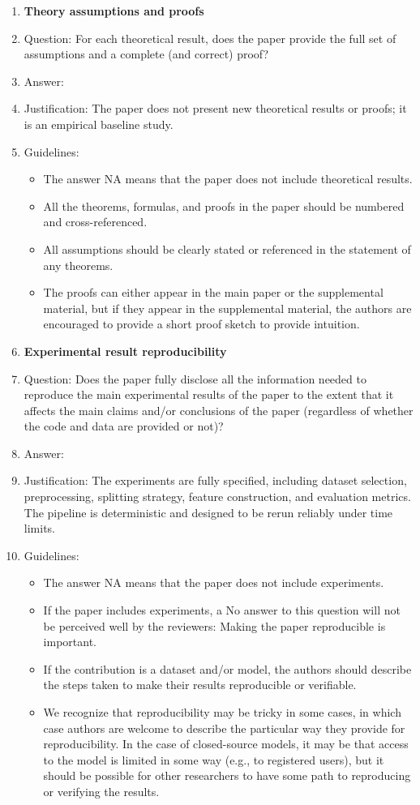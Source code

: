 \documentclass{article}
\theoremstyle{plain}
\theoremstyle{definition}
\theoremstyle{remark}
\begin{document}
\begin{enumerate}
		\item {\bf Theory assumptions and proofs}
		\item[] Question: For each theoretical result, does the paper provide the full set of assumptions and a complete (and correct) proof?
		\item[] Answer: \answerNA{}
		\item[] Justification: The paper does not present new theoretical results or proofs; it is an empirical baseline study.
		\item[] Guidelines:
		\begin{itemize}
			\item The answer NA means that the paper does not include theoretical results. 
			\item All the theorems, formulas, and proofs in the paper should be numbered and cross-referenced.
			\item All assumptions should be clearly stated or referenced in the statement of any theorems.
			\item The proofs can either appear in the main paper or the supplemental material, but if they appear in the supplemental material, the authors are encouraged to provide a short proof sketch to provide intuition. 
		\end{itemize}
		
		\item {\bf Experimental result reproducibility}
		\item[] Question: Does the paper fully disclose all the information needed to reproduce the main experimental results of the paper to the extent that it affects the main claims and/or conclusions of the paper (regardless of whether the code and data are provided or not)?
		\item[] Answer: \answerYes{}
		\item[] Justification: The experiments are fully specified, including dataset selection, preprocessing, splitting strategy, feature construction, and evaluation metrics. The pipeline is deterministic and designed to be rerun reliably under time limits.
		\item[] Guidelines:
		\begin{itemize}
			\item The answer NA means that the paper does not include experiments.
			\item If the paper includes experiments, a No answer to this question will not be perceived well by the reviewers: Making the paper reproducible is important.
			\item If the contribution is a dataset and/or model, the authors should describe the steps taken to make their results reproducible or verifiable. 
			\item We recognize that reproducibility may be tricky in some cases, in which case authors are welcome to describe the particular way they provide for reproducibility. In the case of closed-source models, it may be that access to the model is limited in some way (e.g., to registered users), but it should be possible for other researchers to have some path to reproducing or verifying the results.
		\end{itemize}
		

\end{enumerate}
\end{document}
